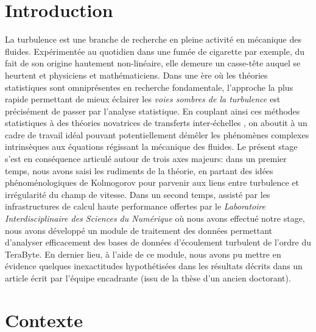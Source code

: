 \documentclass[13pt, a4paper]{extarticle}
\begin{document}

\tableofcontents
\newpage
\listoffigures
\listoftables
{}

\newpage
{}


\section{Introduction}
\noindent La turbulence est une branche de recherche en pleine activité en mécanique 
des fluides. Expérimentée au quotidien dans une fumée de cigarette par exemple, du fait 
de son origine hautement non-linéaire, elle demeure un casse-tête auquel se heurtent 
et physiciens et mathématiciens. Dans une ère où les théories statistiques sont 
omniprésentes en recherche fondamentale, l'approche la plus rapide permettant de mieux 
éclairer les {\it{voies sombres de la turbulence}} est précisément de passer par 
l'analyse statistique. En couplant ainsi ces méthodes statistiques à des théories 
novatrices de transferts inter-échelles \cite{Dubrulle-Beyond}, on aboutit à un 
cadre de travail idéal pouvant potentiellement démêler les phénomènes complexes 
intrinsèques aux équations régissant la mécanique des fluides. Le présent stage 
s'est en conséquence articulé autour de trois axes majeurs: dans un premier 
temps, nous avons saisi les rudiments de la théorie, en partant des idées 
phénoménologiques de Kolmogorov pour parvenir aux liens entre turbulence et 
irrégularité du champ de vitesse.
Dans un second temps, assisté par les infrastructures de calcul haute performance 
offertes par le \emph{Laboratoire Interdisciplinaire des Sciences du Numérique} où 
nous avons effectué notre stage, nous avons développé un module de traitement 
des données permettant d'analyser efficacement des bases de données d'écoulement 
turbulent de l'ordre du TeraByte. En dernier lieu, à l'aide de ce module, nous 
avons pu mettre en évidence quelques inexactitudes hypothétisées dans les résultats 
décrits dans un article écrit par l'équipe encadrante \cite{Faller-Intermittency} 
(issu de la thèse d'un ancien doctorant).

\section{Contexte}
\end{document}
